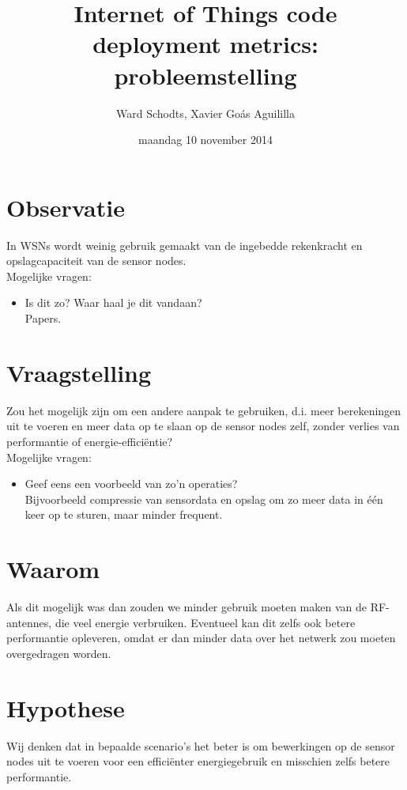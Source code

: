 \documentclass[11pt]{article}
\author{Ward Schodts, Xavier Goás Aguililla}
\date{maandag 10 november 2014}
\title{Internet of Things code deployment metrics: probleemstelling}
\begin{document}
\maketitle

\section{Observatie}
\label{sec-1}
In WSNs wordt weinig gebruik gemaakt van de ingebedde rekenkracht en
opslagcapaciteit van de sensor nodes.\\

Mogelijke vragen: 

\begin{itemize}
\item Is dit zo? Waar haal je dit vandaan?\\
  Papers.
\end{itemize}
\section{Vraagstelling}
\label{sec-2}
Zou het mogelijk zijn om een andere aanpak te gebruiken, d.i. meer
berekeningen uit te voeren en meer data op te slaan op de sensor nodes
zelf, zonder verlies van performantie of energie-efficiëntie?\\

Mogelijke vragen: 

\begin{itemize}
\item Geef eens een voorbeeld van zo'n operaties?\\
  Bijvoorbeeld compressie van sensordata en opslag om zo meer data in
één keer op te sturen, maar minder frequent.
\end{itemize}
\section{Waarom}
\label{sec-3}
Als dit mogelijk was dan zouden we minder gebruik moeten maken van de
RF-antennes, die veel energie verbruiken. Eventueel kan dit zelfs ook
betere performantie opleveren, omdat er dan minder data over het
netwerk zou moeten overgedragen worden.
\section{Hypothese}
\label{sec-4}
Wij denken dat in bepaalde scenario's het beter is om bewerkingen op
de sensor nodes uit te voeren voor een efficiënter energiegebruik en
misschien zelfs betere performantie.\\
\end{document}
